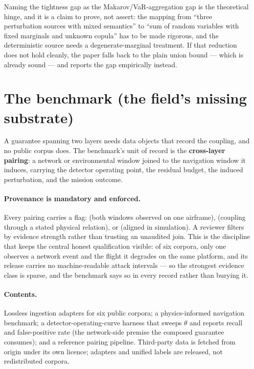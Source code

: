 \documentclass[11pt,a4paper]{article}
\begin{document}
\begin{honestly}
Naming the tightness gap as the Makarov/VaR-aggregation gap is the theoretical
hinge, and it is a claim to prove, not assert: the mapping from ``three
perturbation sources with mixed semantics'' to ``sum of random variables with
fixed marginals and unknown copula'' has to be made rigorous, and the
deterministic source needs a degenerate-marginal treatment. If that reduction
does not hold cleanly, the paper falls back to the plain union bound --- which is
already sound --- and reports the gap empirically instead.
\end{honestly}

\section{The benchmark (the field's missing substrate)}
A guarantee spanning two layers needs data objects that record the coupling, and
no public corpus does. The benchmark's unit of record is the \textbf{cross-layer
pairing}: a network or environmental window joined to the navigation window it
induces, carrying the detector operating point, the residual budget, the induced
perturbation, and the mission outcome.

\paragraph{Provenance is mandatory and enforced.} Every pairing carries a flag:
 (both windows observed on one airframe),
 (coupling through a stated physical relation), or
 (aligned in simulation). A reviewer filters by
evidence strength rather than trusting an unaudited join. This is the discipline
that keeps the central honest qualification visible: of six corpora, only one
observes a network event and the flight it degrades on the same platform, and its
release carries no machine-readable attack intervals --- so the strongest
evidence class is sparse, and the benchmark says so in every record rather than
burying it.

\paragraph{Contents.} Lossless ingestion adapters for six public corpora; a
physics-informed navigation benchmark; a detector-operating-curve harness that
sweeps $\theta$ and reports recall and false-positive rate (the network-side
premise the composed guarantee consumes); and a reference pairing pipeline.
Third-party data is fetched from origin under its own licence; adapters and
unified labels are released, not redistributed corpora.
\end{document}

